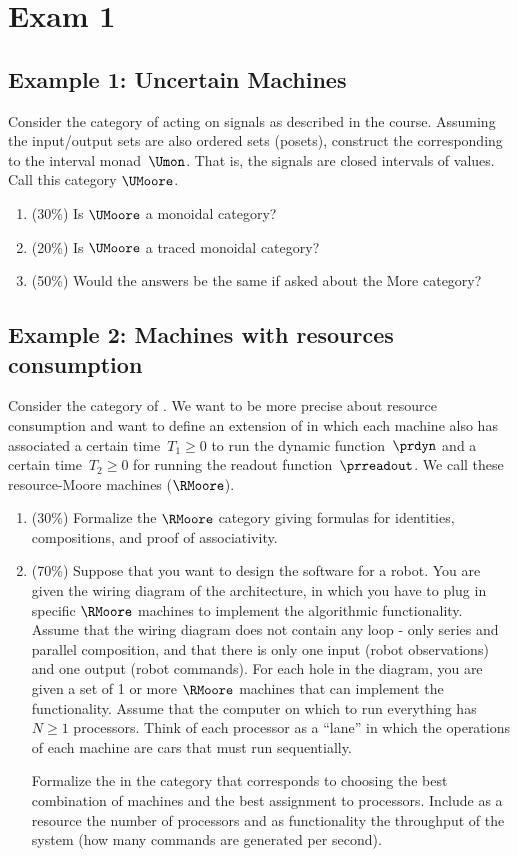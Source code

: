 \section{Exam 1}
\subsection{Example 1: Uncertain Machines}

Consider the category of  acting on signals as described in the course.
Assuming the input/output sets are also ordered sets (posets), construct the  corresponding to the interval monad~$\Umon$.
That is, the signals are closed intervals of values.
Call this category $\UMoore$.
\begin{enumerate}
    \item (30\%) Is $\UMoore$ a monoidal category?
    \item (20\%) Is $\UMoore$ a traced monoidal category?
    \item (50\%) Would the answers be the same if asked about the More category? %
\end{enumerate}

\subsection{Example 2: Machines with resources consumption}
Consider the category of .
We want to be more precise about resource consumption and want to define an extension of  in which each machine also has associated a certain time~$T_1\geq 0$ to run the dynamic function~$\prdyn$ and a certain time~$T_2\geq 0$ for running the readout function~$\prreadout$.
We call these resource-Moore machines ($\RMoore$).

\begin{enumerate}
    \item (30\%) Formalize the $\RMoore$ category giving formulas for identities, compositions, and proof of associativity.
    \item (70\%) Suppose that you want to design the software for a robot.
          You are given the wiring diagram of the architecture, in which you have to plug in specific $\RMoore$ machines to implement the algorithmic functionality.
          Assume that the wiring diagram does not contain any loop - only series and parallel composition, and that there is only one input (robot observations) and one output (robot commands).
          For each hole in the diagram, you are given a set of 1 or more $\RMoore$ machines that can implement the functionality.
          Assume that the computer on which to run everything has~$N\geq 1$ processors.
          Think of each processor as a ``lane'' in which the operations of each machine are cars that must run sequentially.

          Formalize the  in the category \DPI that corresponds to choosing the best combination of machines and the best assignment to processors.
          Include as a resource the number of processors and as functionality the throughput of the system (how many commands are generated per second).
\end{enumerate}

